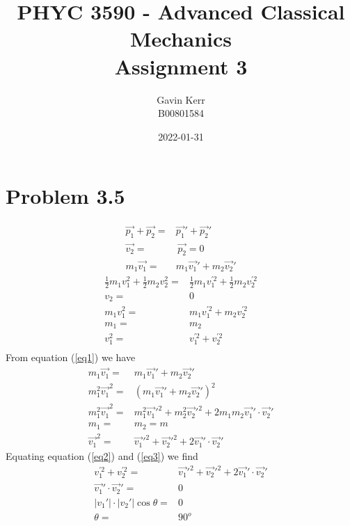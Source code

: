 \documentclass[12pt, a4paper]{article}
\title{PHYC 3590 - Advanced Classical Mechanics\\Assignment 3}
\author{Gavin Kerr\\B00801584}
\date{2022-01-31}
\begin{document}
\maketitle








\section*{Problem 3.5}
\begin{align}
\vec{p_1} + \vec{p_2} =& \vec{p_1}' + \vec{p_2}'
\\
\vec{v_2} =& \, \vec{p_2} = 0
\\
m_1\vec{v_1} =& m_1\vec{v_1}' + m_2\vec{v_2}' \label{eq1}
\end{align}
\begin{align}
\tfrac{1}{2}m_1v_1^2 + \tfrac{1}{2}m_2v_2^2 =& \tfrac{1}{2}m_1v_1^{'2} + \tfrac{1}{2}m_2v_2^{'2}
\\
v_2 =& 0
\\
m_1v_1^2 =& m_1v_1^{'2} + m_2v_2^{'2} 
\\
m_1 =& m_2
\\
v_1^2 =& v_1^{'2} + v_2^{'2} \label{eq2}
\\
\end{align}
From equation (\ref{eq1}) we have
\begin{align}
m_1\vec{v_1} =& m_1\vec{v_1}' + m_2\vec{v_2}' 
\\
m_1^2\vec{v_1}^2 =& (m_1\vec{v_1}' + m_2\vec{v_2}')^2 
\\
m_1^2\vec{v_1}^2 =& m_1^2 \vec{v_1}'^2  + m_2^2 \vec{v_2}'^2 + 2m_1m_2\vec{v_1}'\cdot\vec{v_2}'
\\
m_1 =& m_2 = m
\\
\vec{v_1}^2 =& \vec{v_1}'^2  + \vec{v_2}'^2 + 2\vec{v_1}'\cdot\vec{v_2}' \label{eq3}
\end{align}
Equating equation (\ref{eq2}) and (\ref{eq3}) we find
\begin{align*}
v_1^{'2} + v_2^{'2} =& \vec{v_1}'^2  + \vec{v_2}'^2 + 2\vec{v_1}'\cdot\vec{v_2}'
\\
\vec{v_1}'\cdot\vec{v_2}' =& 0
\\
|v_1'| \cdot |v_2'| \cos\theta =& 0
\\
\theta =& \boxed{90^o}
\end{align*}
\end{document}
